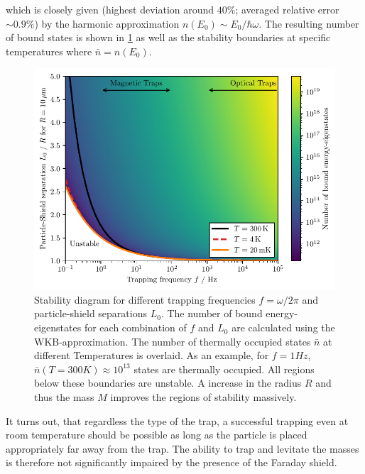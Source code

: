which is closely given (highest deviation around $40\%$; averaged relative error $\sim 0.9\%$) by the harmonic approximation $n(E_0) \sim E_0 / \hbar \omega$.
The resulting number of bound states is shown in \cref{fig:4:trap-stability} as well as the stability boundaries at specific temperatures where $\bar{n} = n(E_0)$.
\begin{figure}[!htbp]
  \centering
  \includegraphics[width=\textwidth]{./../figures/others/trap-stability-with-R.pdf}
  \caption{Stability diagram for different trapping frequencies $f = \omega/2\pi$ and particle-shield separations $L_0$. The number of bound energy-eigenstates for each combination of $f$ and $L_0$ are calculated using the WKB-approximation. The number of thermally occupied states $\bar{n}$ at different Temperatures is overlaid. As an example, for $f=1\si{Hz}$, $\bar{n}(T=300\si{K})\approx 10^{13}$ states are thermally occupied. All regions below these boundaries are unstable. A increase in the radius $R$ and thus the mass $M$ improves the regions of stability massively.}
  \label{fig:4:trap-stability}
\end{figure}
It turns out, that regardless the type of the trap, a successful trapping even at room temperature should be possible as long as the particle is placed appropriately far away from the trap.
The ability to trap and levitate the masses is therefore not significantly impaired by the presence of the Faraday shield.
